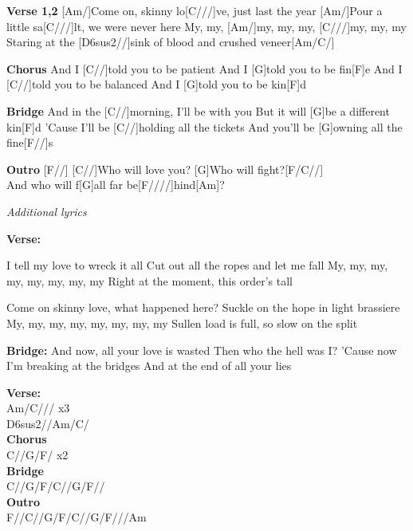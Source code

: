 \documentclass{article}
\begin{document}
\begin{guitar}
\begin{multicols}{2}

\textbf{Verse 1,2}
[Am/]Come on, skinny lo[C///]ve, just last the year
[Am/]Pour a little sa[C///]lt, we were never here
My, my, [Am/]my, my, my, [C///]my,  my, my
Staring at the [D6sus2//]sink of blood and crushed veneer[Am/C/]

\textbf{Chorus}
And I [C//]told you to be patient
And I [G]told you to be fin[F]e
And I [C//]told you to be balanced
And I [G]told you to be kin[F]d

\textbf{Bridge}
And in the [C//]morning, I'll be with you
But it will [G]be a different kin[F]d
'Cause I'll be [C//]holding all the tickets
And you'll be [G]owning all the fine[F//]s

\textbf{Outro}
[F//]
[C//]Who will love you?
[G]Who will fight?[F/C//]\\
And who will f[G]all
far be[F////]hind[Am]?

\end{multicols}

\begin{center}
\textit{Additional lyrics}
\end{center}
\begin{multicols}{2}
\begin{flushleft}
\textbf{Verse:}

I tell my love to wreck it all
Cut out all the ropes and let me fall
My, my, my, my, my, my, my, my
Right at the moment, this order's tall

Come on skinny love, what happened here?
Suckle on the hope in light brassiere
My, my, my, my, my, my, my, my
Sullen load is full, so slow on the split

\columnbreak

\textbf{Bridge:}
And now, all your love is wasted
Then who the hell was I?
'Cause now I'm breaking at the bridges
And at the end of all your lies
\end{flushleft}
\end{multicols}
\end{guitar}

\textbf{Verse:}\\
Am/C/// x3\\
D6sus2//Am/C/\\
\textbf{Chorus}\\
C//G/F/ x2\\
\textbf{Bridge}\\
C//G/F/C//G/F//\\
\textbf{Outro}\\
F//C//G/F/C//G/F///Am
\end{document}
